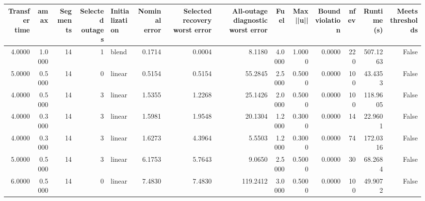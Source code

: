 \begin{tabular}{rrrrlrrrrrrrrr}
\toprule
Transfer time & amax & Segments & Selected outages & Initialization & Nominal error & Selected recovery worst error & All-outage diagnostic worst error & Fuel & Max ||u|| & Bound violation & nfev & Runtime (s) & Meets thresholds \\
\midrule
4.0000 & 1.0000 & 14 & 1 & blend & 0.1714 & 0.0004 & 8.1180 & 4.0000 & 1.0000 & 0.0000 & 220 & 507.1263 & False \\
5.0000 & 0.5000 & 14 & 0 & linear & 0.5154 & 0.5154 & 55.2845 & 2.5000 & 0.5000 & 0.0000 & 100 & 43.4353 & False \\
4.0000 & 0.5000 & 14 & 3 & linear & 1.5355 & 1.2268 & 25.1426 & 2.0000 & 0.5000 & 0.0000 & 100 & 118.9605 & False \\
4.0000 & 0.3000 & 14 & 3 & linear & 1.5981 & 1.9548 & 20.1304 & 1.2000 & 0.3000 & 0.0000 & 14 & 22.9601 & False \\
4.0000 & 0.3000 & 14 & 3 & linear & 1.6273 & 4.3964 & 5.5503 & 1.2000 & 0.3000 & 0.0000 & 74 & 172.0316 & False \\
5.0000 & 0.5000 & 14 & 3 & linear & 6.1753 & 5.7643 & 9.0650 & 2.5000 & 0.5000 & 0.0000 & 30 & 68.2684 & False \\
6.0000 & 0.5000 & 14 & 0 & linear & 7.4830 & 7.4830 & 119.2412 & 3.0000 & 0.5000 & 0.0000 & 100 & 49.9072 & False \\
\bottomrule
\end{tabular}
